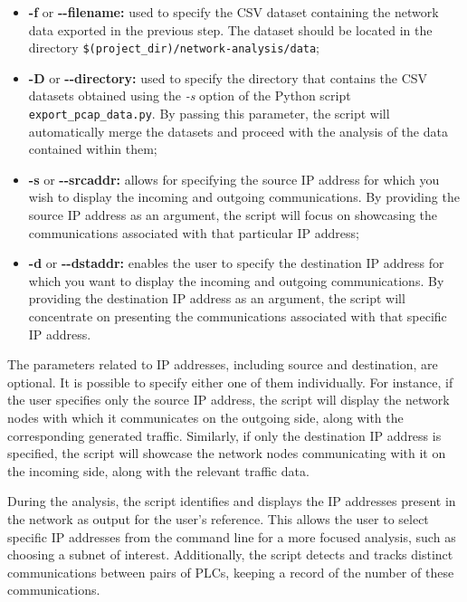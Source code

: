 \begin{itemize}
	\item \textbf{-f} or \textbf{{-}{-}filename:} used to specify the CSV dataset containing the network data exported in the previous step. The dataset should be located in the directory \texttt{\$(project\_dir)/network-analysis/data};
	
	\item \textbf{-D} or \textbf{{-}{-}directory:} used to specify the directory that contains the CSV datasets obtained using the \textit{-s} option of the Python script \texttt{export\_pcap\_data.py}. By passing this parameter, the script will automatically merge the datasets and proceed with the analysis of the data contained within them;
	
	\item \textbf{-s} or \textbf{{-}{-}srcaddr:} allows for specifying the source IP address for which you wish to display the incoming and outgoing communications. By providing the source IP address as an argument, the script will focus on showcasing the communications associated with that particular IP address;
	
	\item \textbf{-d} or \textbf{{-}{-}dstaddr:} enables the user to specify the destination IP address for which you want to display the incoming and outgoing communications. By providing the destination IP address as an argument, the script will concentrate on presenting the communications associated with that specific IP address.
\end{itemize}

The parameters related to IP addresses, including source and destination, are optional. It is possible to specify either one of them individually. For instance, if the user specifies only the source IP address, the script will display the network nodes with which it communicates on the outgoing side, along with the corresponding generated traffic. Similarly, if only the destination IP address is specified, the script will showcase the network nodes communicating with it on the incoming side, along with the relevant traffic data.

\bigskip
During the analysis, the script identifies and displays the IP addresses present in the network as output for the user's reference. This allows the user to select specific IP addresses from the command line for a more focused analysis, such as choosing a subnet of interest. Additionally, the script detects and tracks distinct communications between pairs of PLCs, keeping a record of the number of these communications.


